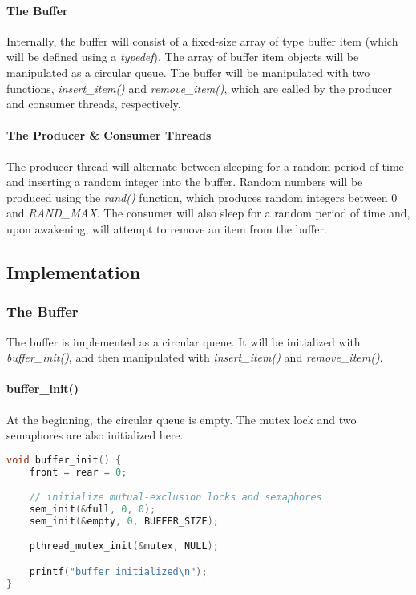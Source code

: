 \documentclass{article}
\begin{document}
\paragraph{\textbf{The Buffer}}
Internally, the buffer will consist of a fixed-size array of type buffer item
(which will be defined using a \textit{typedef}). The array of buffer item objects
will be manipulated as a circular queue. The buffer will be manipulated with two functions, \textit{insert\_item()} and
\textit{remove\_item()}, which are called by the producer and consumer threads,
respectively. 

\paragraph{\textbf{The Producer \& Consumer Threads}}
The producer thread will alternate between sleeping for a random period of
time and inserting a random integer into the buffer. Random numbers will
be produced using the \textit{rand()} function, which produces random integers
between 0 and \textit{RAND\_MAX}. The consumer will also sleep for a random period
of time and, upon awakening, will attempt to remove an item from the buffer.

\subsection*{Implementation}
\subsubsection*{The Buffer}
The buffer is implemented as a circular queue. It will be initialized with \textit{buffer\_init()}, and then manipulated with \textit{insert\_item()} and \textit{remove\_item()}.

\paragraph{\textbf{buffer\_init()}} At the beginning, the circular queue is empty. The mutex lock and two semaphores are also initialized here.

\begin{lstlisting}[language=c, caption={buffer\_init()}]
void buffer_init() {
    front = rear = 0;

    // initialize mutual-exclusion locks and semaphores
    sem_init(&full, 0, 0);
    sem_init(&empty, 0, BUFFER_SIZE);

    pthread_mutex_init(&mutex, NULL);

    printf("buffer initialized\n");
}
\end{lstlisting}
\end{document}
